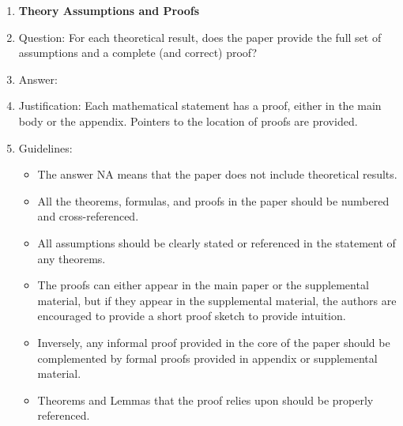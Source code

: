 \documentclass{article}
\begin{document}
\begin{enumerate}
\item {\bf Theory Assumptions and Proofs}
    \item[] Question: For each theoretical result, does the paper provide the full set of assumptions and a complete (and correct) proof?
    \item[] Answer: \answerYes{} %
    \item[] Justification: Each mathematical statement has a proof, either in the main body or the appendix. Pointers to the location of proofs are provided.
    \item[] Guidelines:
    \begin{itemize}
        \item The answer NA means that the paper does not include theoretical results.
        \item All the theorems, formulas, and proofs in the paper should be numbered and cross-referenced.
        \item All assumptions should be clearly stated or referenced in the statement of any theorems.
        \item The proofs can either appear in the main paper or the supplemental material, but if they appear in the supplemental material, the authors are encouraged to provide a short proof sketch to provide intuition.
        \item Inversely, any informal proof provided in the core of the paper should be complemented by formal proofs provided in appendix or supplemental material.
        \item Theorems and Lemmas that the proof relies upon should be properly referenced.
    \end{itemize}


\end{enumerate}
\end{document}
